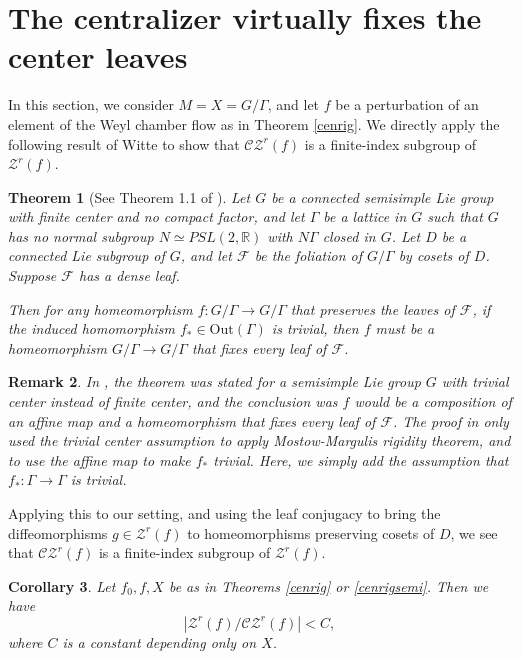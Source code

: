 \documentclass[11pt]{amsart}
\numberwithin{equation}{section}
\newcommand{\R}{\mathbb{R}}
\newcommand{\CZ}{\mathcal{CZ}}
\theoremstyle{plain}
\newtheorem{thm}{Theorem}[section]
\newtheorem{cor}[thm]{Corollary}
\newtheorem{rmk}[thm]{Remark}
\begin{document}
\section{The centralizer virtually fixes the center leaves}\label{centgp}

In this section, we consider $M=X=G/\Gamma$, and let $f$ be a perturbation of an element of the Weyl chamber flow as in Theorem \ref{cenrig}. We directly apply the following result of Witte \cite{Witte} to show that $\CZ^r(f)$ is a finite-index subgroup of $\mathcal{Z}^r(f)$.

\begin{thm}[See Theorem 1.1 of \cite{Witte}]\label{witte}
Let $G$ be a connected semisimple Lie group with finite center and no compact factor, and let $\Gamma$ be a lattice in $G$ such that $G$ has no normal subgroup $N\simeq PSL(2,\R)$ with $N\Gamma$ closed in $G$. Let $D$ be a connected Lie subgroup of $G$, and let $\mathcal{F}$ be the foliation of $G/\Gamma$ by cosets of $D$. {Suppose $\mathcal{F}$ has a dense leaf.}

Then for any homeomorphism $f: G/\Gamma\to G/\Gamma$ that preserves the leaves of $\mathcal{F}$, if the induced homomorphism $f_*\in \mathrm{Out}(\Gamma)$ is trivial, then $f$ must be a homeomorphism $G/\Gamma\to G/\Gamma$ that fixes every leaf of $\mathcal{F}$.
\end{thm}

\begin{rmk}
In \cite{Witte}, the theorem was stated for a semisimple Lie group $G$ with trivial center instead of finite center, and the conclusion was $f$ would be a composition of an affine map and a homeomorphism that fixes every leaf of $\mathcal{F}$. The proof in \cite{Witte} only used the trivial center assumption to apply Mostow-Margulis rigidity theorem, and to use the affine map to make $f_*$ trivial. Here, we simply add the assumption that $f_*:\Gamma\to\Gamma$ is trivial.
\end{rmk}

Applying this to our setting, and using the leaf conjugacy to bring the diffeomorphisms $g\in \mathcal{Z}^r(f)$ to homeomorphisms preserving cosets of $D$, we see that $\CZ^r(f)$ is a finite-index subgroup of $\mathcal{Z}^r(f)$.

\begin{cor}
Let $f_0,f,X$ be as in Theorems \ref{cenrig} or \ref{cenrigsemi}. Then we have
$$|\mathcal{Z}^r(f)/\CZ^r(f)|<C,$$
where $C$ is a constant depending only on $X$.
\end{cor}
\end{document}
